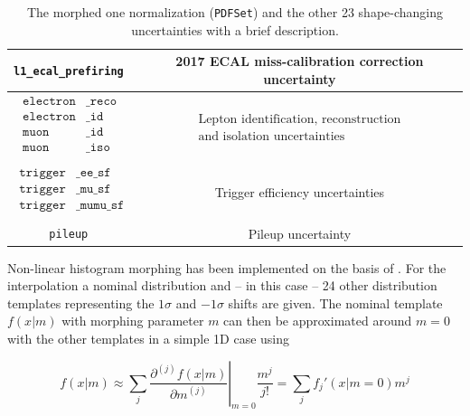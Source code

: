 \begin{table}[h!]
\begin{tabular}{cc}
		\hline
		\texttt{l1\_ecal\_prefiring  } & 2017 ECAL miss-calibration correction uncertainty \\
		
		\hline		
		$\begin{aligned}
			\texttt{electron}&\texttt{\_reco } \\
			\texttt{electron}&\texttt{\_id   } \\
			\texttt{muon}&\texttt{\_id       } \\
			\texttt{muon}&\texttt{\_iso      } \\
		\end{aligned}$         & $\begin{array}{c}
			\text{Lepton identification, reconstruction} \\
			\text{and isolation uncertainties}
		\end{array}$\\
		
		\hline
		$\begin{aligned}
			\texttt{trigger}&\texttt{\_ee\_sf  } \\
			\texttt{trigger}&\texttt{\_mu\_sf  } \\
			\texttt{trigger}&\texttt{\_mumu\_sf} \\
		\end{aligned}$ & Trigger efficiency uncertainties \\
		\hline
		\texttt{pileup               } & Pileup uncertainty \\
	\end{tabular}
	\caption{The morphed one normalization (\texttt{PDFSet}) and the other 23 shape-changing uncertainties with a brief description.}
	\label{tab:s_sys_table}
\end{table}


Non-linear histogram morphing has been implemented on the basis of \cite{Baak_2015}. For the interpolation a nominal distribution and -- in this case -- 24 other distribution templates representing the $1\sigma$ and $-1\sigma$ shifts are given. The nominal template $f(x|m)$ with morphing parameter $m$ can then be approximated around $m=0$ with the other templates in a simple 1D case using

\begin{equation*}
	f(x|m) \approx \sum_j \left.\frac{\partial^{(j)} f(x|m)}{\partial m^{(j)}}\right|_{m=0}\frac{m^j}{j!} = \sum_j f_j'(x|m=0) m^j
\end{equation*}



